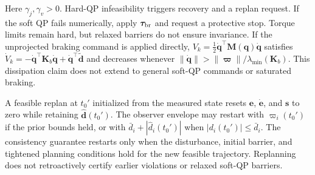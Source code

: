 Here $\gamma_j,\gamma_v>0$. Hard-QP infeasibility triggers recovery and a replan request. If the soft QP fails numerically, apply $\bm\tau_{\rm br}$ and request a protective stop. Torque limits remain hard, but relaxed barriers do not ensure invariance. If the unprojected braking command is applied directly, $V_k=\frac12\dot{\bm q}^\top\bm M(\bm q)\dot{\bm q}$ satisfies $\dot V_k=-\dot{\bm q}^\top\bm K_b\dot{\bm q}+\dot{\bm q}^\top\tilde{\bm d}$ and decreases whenever $\|\dot{\bm q}\|>\|\bm\varpi\|/\lambda_{\min}(\bm K_b)$. This dissipation claim does not extend to general soft-QP commands or saturated braking.

\begin{remark}
A feasible replan at $t_0'$ initialized from the measured state
resets $\bm e$, $\dot{\bm e}$, and $\bm s$ to zero while retaining
$\hat{\bm d}(t_0')$. The observer envelope may restart with
$\varpi_i(t_0')$ if the prior bounds held, or with
$\bar d_i+|\hat d_i(t_0')|$ when $|d_i(t_0')|\le\bar d_i$.
The consistency guarantee restarts only when the disturbance,
initial barrier, and tightened planning conditions hold for
the new feasible trajectory. Replanning does not retroactively
certify earlier violations or relaxed soft-QP barriers.
\end{remark}
